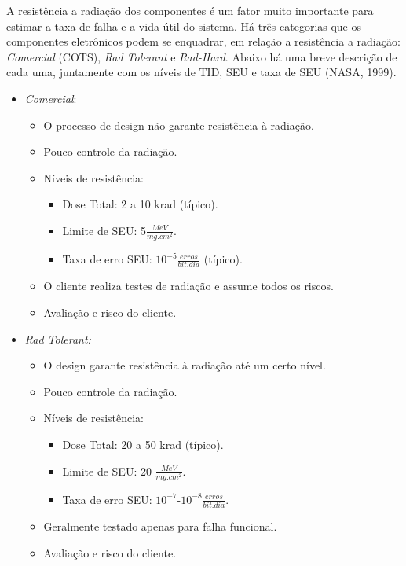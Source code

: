 A resistência a radiação dos componentes é um fator muito importante para estimar a taxa de falha e a vida útil do sistema. Há três categorias que os componentes eletrônicos podem se enquadrar, em relação a resistência a radiação: \textit{Comercial} (COTS), \textit{Rad Tolerant} e \textit{Rad-Hard}. Abaixo há uma breve descrição de cada uma, juntamente com os níveis de TID, SEU e taxa de SEU (NASA, 1999).

\begin{itemize}
	\item \textit{Comercial}:
	
	\begin{itemize}
		\item O processo de design não garante resistência à radiação.
		\item Pouco controle da radiação.
		\item Níveis de resistência: 
		
		\begin{itemize}
			\item Dose Total: 2 a 10 krad (típico).
			\item Limite de SEU: 5$\frac{MeV}{mg.cm^{2}}$.
			\item Taxa de erro SEU: $10^{-5}\frac{erros}{bit.dia}$ (típico).
		\end{itemize}
		\item O cliente realiza testes de radiação e assume todos os riscos.
		\item Avaliação e risco do cliente.
		
	\end{itemize}
	
	\item \textit{Rad Tolerant:}
	\begin{itemize}
		\item O design garante resistência à radiação até um certo nível.
		\item Pouco controle da radiação.
		\item Níveis de resistência: 
		\begin{itemize}
			\item Dose Total: 20 a 50 krad (típico).
			\item Limite de SEU: 20 $\frac{MeV}{mg.cm^{2}}$.
			\item Taxa de erro SEU: ${10^{-7}}$-$10^{-8}\frac{erros}{bit.dia}$.
		\end{itemize}  
		
		\item Geralmente testado apenas para falha funcional.
		\item Avaliação e risco do cliente.
		

\end{itemize}
\end{itemize}
